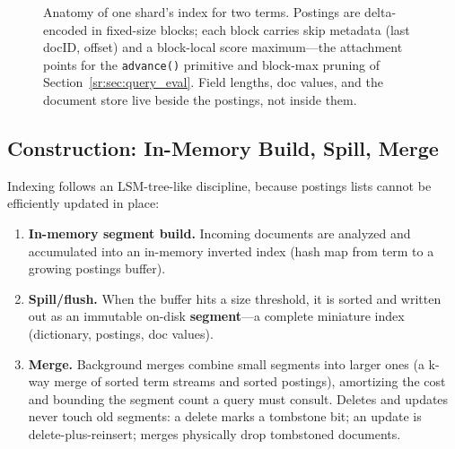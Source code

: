 \begin{figure}[H]
\caption{Anatomy of one shard's index for two terms. Postings are delta-encoded in fixed-size blocks; each block carries skip metadata (last docID, offset) and a block-local score maximum---the attachment points for the \texttt{advance()} primitive and block-max pruning of Section~\ref{sr:sec:query_eval}. Field lengths, doc values, and the document store live beside the postings, not inside them.}
\label{sr:fig:index_anatomy}
\end{figure}

\subsection{Construction: In-Memory Build, Spill, Merge}

Indexing follows an LSM-tree-like discipline, because postings lists cannot be efficiently updated in place:

\begin{enumerate}
    \item \textbf{In-memory segment build.} Incoming documents are analyzed and accumulated into an in-memory inverted index (hash map from term to a growing postings buffer).
    \item \textbf{Spill/flush.} When the buffer hits a size threshold, it is sorted and written out as an immutable on-disk \textbf{segment}---a complete miniature index (dictionary, postings, doc values).
    \item \textbf{Merge.} Background merges combine small segments into larger ones (a k-way merge of sorted term streams and sorted postings), amortizing the cost and bounding the segment count a query must consult. Deletes and updates never touch old segments: a delete marks a tombstone bit; an update is delete-plus-reinsert; merges physically drop tombstoned documents.
\end{enumerate}

